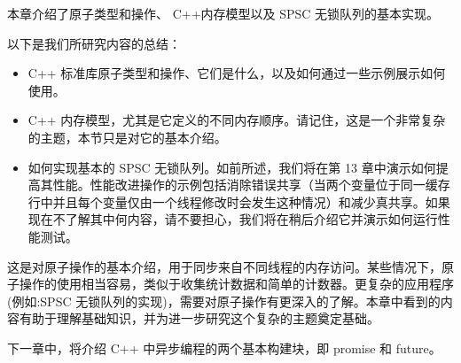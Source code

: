 本章介绍了原子类型和操作、 C++内存模型以及 SPSC 无锁队列的基本实现。

以下是我们所研究内容的总结：

\begin{itemize}
\item
C++ 标准库原子类型和操作、它们是什么，以及如何通过一些示例展示如何使用。

\item
C++ 内存模型，尤其是它定义的不同内存顺序。请记住，这是一个非常复杂的主题，本节只是对它的基本介绍。

\item
如何实现基本的 SPSC 无锁队列。如前所述，我们将在第 13 章中演示如何提高其性能。性能改进操作的示例包括消除错误共享（当两个变量位于同一缓存行中并且每个变量仅由一个线程修改时会发生这种情况）和减少真共享。如果现在不了解其中何内容，请不要担心，我们将在稍后介绍它并演示如何运行性能测试。
\end{itemize}

这是对原子操作的基本介绍，用于同步来自不同线程的内存访问。某些情况下，原子操作的使用相当容易，类似于收集统计数据和简单的计数器。更复杂的应用程序(例如:SPSC 无锁队列的实现)，需要对原子操作有更深入的了解。本章中看到的内容有助于理解基础知识，并为进一步研究这个复杂的主题奠定基础。

下一章中，将介绍 C++ 中异步编程的两个基本构建块，即 promise 和 future。